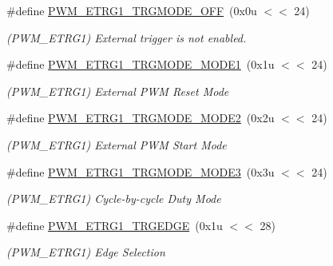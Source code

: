 \begin{DoxyCompactItemize}
\#define \mbox{\hyperlink{group__SAMV71__PWM_gab78ee7b73c5e1f7bbdf482379c2327a4}{P\+W\+M\+\_\+\+E\+T\+R\+G1\+\_\+\+T\+R\+G\+M\+O\+D\+E\+\_\+\+O\+FF}}~(0x0u $<$$<$ 24)
\begin{DoxyCompactList}\small\item\em (P\+W\+M\+\_\+\+E\+T\+R\+G1) External trigger is not enabled. \end{DoxyCompactList}\item 
\mbox{\label{group__SAMV71__PWM_ga8e6f77af5ddfbe450441c05ef8c03986}} 
\#define \mbox{\hyperlink{group__SAMV71__PWM_ga8e6f77af5ddfbe450441c05ef8c03986}{P\+W\+M\+\_\+\+E\+T\+R\+G1\+\_\+\+T\+R\+G\+M\+O\+D\+E\+\_\+\+M\+O\+D\+E1}}~(0x1u $<$$<$ 24)
\begin{DoxyCompactList}\small\item\em (P\+W\+M\+\_\+\+E\+T\+R\+G1) External P\+WM Reset Mode \end{DoxyCompactList}\item 
\mbox{\label{group__SAMV71__PWM_gad3d2b1a7d8f9be6ebe009a60434084ee}} 
\#define \mbox{\hyperlink{group__SAMV71__PWM_gad3d2b1a7d8f9be6ebe009a60434084ee}{P\+W\+M\+\_\+\+E\+T\+R\+G1\+\_\+\+T\+R\+G\+M\+O\+D\+E\+\_\+\+M\+O\+D\+E2}}~(0x2u $<$$<$ 24)
\begin{DoxyCompactList}\small\item\em (P\+W\+M\+\_\+\+E\+T\+R\+G1) External P\+WM Start Mode \end{DoxyCompactList}\item 
\mbox{\label{group__SAMV71__PWM_ga59cd934d93706f2eaad1f8daa1bb004e}} 
\#define \mbox{\hyperlink{group__SAMV71__PWM_ga59cd934d93706f2eaad1f8daa1bb004e}{P\+W\+M\+\_\+\+E\+T\+R\+G1\+\_\+\+T\+R\+G\+M\+O\+D\+E\+\_\+\+M\+O\+D\+E3}}~(0x3u $<$$<$ 24)
\begin{DoxyCompactList}\small\item\em (P\+W\+M\+\_\+\+E\+T\+R\+G1) Cycle-\/by-\/cycle Duty Mode \end{DoxyCompactList}\item 
\mbox{\label{group__SAMV71__PWM_gaaf0120437d89414d59690742b3efa100}} 
\#define \mbox{\hyperlink{group__SAMV71__PWM_gaaf0120437d89414d59690742b3efa100}{P\+W\+M\+\_\+\+E\+T\+R\+G1\+\_\+\+T\+R\+G\+E\+D\+GE}}~(0x1u $<$$<$ 28)
\begin{DoxyCompactList}\small\item\em (P\+W\+M\+\_\+\+E\+T\+R\+G1) Edge Selection \end{DoxyCompactList}\item 
$$
\end{DoxyCompactItemize}
